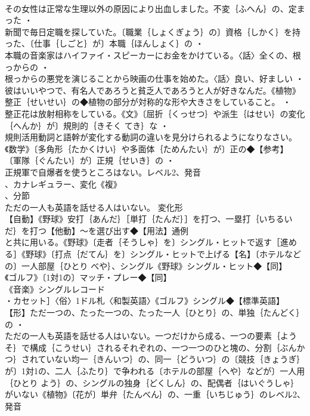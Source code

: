\documentclass[8pt]{extreport}
\begin{document}
\begin{CJK}{UTF8}{min}
\\	その女性は正常な生理以外の原因により出血しました。不変｛ふへん｝の、定まった ・
\\	新聞で毎日定職を探していた。〔職業｛しょくぎょう｝の〕資格｛しかく｝を持った、〔仕事｛しごと｝が〕本職｛ほんしょく｝の ・
\\	本職の音楽家はハイファイ・スピーカーにお金をかけている。〈話〉全くの、根っからの ・
\\	根っからの悪党を演じることから映画の仕事を始めた。〈話〉良い、好ましい ・
\\	彼はいいやつで、有名人であろうと貧乏人であろうと人が好きなんだ。《植物》整正｛せいせい｝の◆植物の部分が対称的な形や大きさをしていること。 ・
\\	整正花は放射相称をしている。《文》〔屈折｛くっせつ｝や派生｛はせい｝の変化｛へんか｝が〕規則的｛きそく てき｝な ・
\\	規則活用動詞と語幹が変化する動詞の違いを見分けられるようになりなさい。《数学》〔多角形｛たかくけい｝や多面体｛ためんたい｝が〕正の◆【参考】
\\	〔軍隊｛ぐんたい｝が〕正規｛せいき｝の ・
\\	正規軍で自爆者を使うところはない。レベル2、発音
\\	、カナレギュラー、変化《複》
\\	、分節
\\	ただの一人も英語を話せる人はいない。	変化形 
\\	【自動】《野球》安打｛あんだ｝［単打｛たんだ｝］を打つ、一塁打｛いちるいだ｝を打つ【他動】～を選び出す◆【用法】通例
\\	と共に用いる。《野球》〔走者｛そうしゃ｝を〕シングル・ヒットで返す［進める］《野球》〔打点｛だてん｝を〕シングル・ヒットで上げる【名】〔ホテルなどの〕一人部屋｛ひとり べや｝、シングル《野球》シングル・ヒット◆【同】
\\	《ゴルフ》〔1対1の〕マッチ・プレー◆【同】
\\	《音楽》シングルレコード
\\	・カセット］〈俗〉1ドル札〈和製英語〉《ゴルフ》シングル◆【標準英語】
\\	【形】ただ一つの、たった一つの、たった一人｛ひとり｝の、単独｛たんどく｝の ・
\\	ただの一人も英語を話せる人はいない。一つだけから成る、一つの要素｛ようそ｝で構成｛こうせい｝されるそれぞれの、一つ一つのひと塊の、分割｛ぶんかつ｝されていない均一｛きんいつ｝の、同一｛どういつ｝の〔競技｛きょうぎ｝が〕1対1の、二人｛ふたり｝で争われる〔ホテルの部屋｛へや｝などが〕一人用｛ひとり よう｝の、シングルの独身｛どくしん｝の、配偶者｛はいぐうしゃ｝がいない《植物》〔花が〕単弁｛たんべん｝の、一重｛いちじゅう｝のレベル2、発音

\end{CJK}
\end{document}
